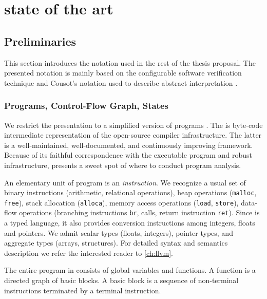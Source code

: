 \chapter{state of the art}
\label{ch:state}


\section{Preliminaries}
\label{sec:preliminaries}

This section introduces the notation used in the rest of the thesis proposal.
The presented notation is mainly based on the configurable software
verification technique \cite{Beyer2007, Beyer2018, Beyer2018b} and Cousot's
notation used to describe abstract interpretation \cite{Cousot2012}.

\subsection{Programs, Control-Flow Graph, States}

We restrict the presentation to a simplified version of \llvmir programs
\cite{Lattner04}. The \llvmir is byte-code intermediate representation of the
open-source \llvm compiler infrastructure.  The latter is a well-main\-tained,
well-documented, and continuously improving framework. Because of its faithful
correspondence with the executable program and robust infrastructure, \llvm
presents a sweet spot of where to conduct program analysis.

An elementary unit of \llvm program is an \emph{instruction}. We recognize a
usual set of binary instructions (arithmetic, relational operations), heap
operations (\texttt{malloc}, \texttt{free}), stack allocation
(\texttt{alloca}), memory access operations (\texttt{load}, \texttt{store}),
data-flow operations (branching instructions \texttt{br}, calls, return
instruction \texttt{ret}).  Since \llvmir is a typed language, it also provides
conversion instructions among integers, floats and pointers. We admit scalar
types (floats, integers), pointer types, and aggregate types (arrays,
structures).  For detailed syntax and semantics description we refer the
interested reader to \autoref{ch:llvm}.

The entire program in \llvm consists of global variables and functions.  A
function is a directed graph of basic blocks. A basic block is a sequence of
non-terminal instructions terminated by a terminal instruction.


